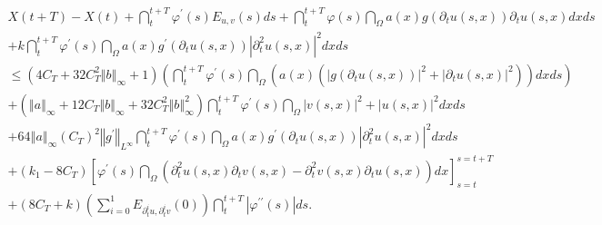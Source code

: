 \documentclass[11pt,reqno]{amsart}
\theoremstyle{plain}
\numberwithin{equation}{section}
\numberwithin{equation}{section}
\begin{document}
\begin{equation*}
\begin{array}{l}
X\left( t+T\right) -X\left( t\right) +\dint_{t}^{t+T}\varphi ^{\prime
}\left( s\right) E_{u,v}\left( s\right) ds+\dint_{t}^{t+T}\varphi \left(
s\right) \dint_{\Omega }a\left( x\right) g\left( \partial _{t}u\left(
s,x\right) \right) \partial _{t}u\left( s,x\right) dxds \\ 
+k\dint_{t}^{t+T}\varphi ^{\prime }\left( s\right) \dint_{\Omega }a\left(
x\right) g^{\prime }\left( \partial _{t}u\left( s,x\right) \right)
\left\vert \partial _{t}^{2}u\left( s,x\right) \right\vert ^{2}dxds \\ 
\leq \left( 4C_{T}+32C_{T}^{2}\left\Vert b\right\Vert _{\infty }+1\right)
\left( \dint_{t}^{t+T}\varphi ^{\prime }\left( s\right) \dint_{\Omega
}\left( a\left( x\right) \left( \left\vert g\left( \partial _{t}u\left(
s,x\right) \right) \right\vert ^{2}+\left\vert \partial _{t}u\left(
s,x\right) \right\vert ^{2}\right) \right) dxds\right) \\ 
+\left( \left\Vert a\right\Vert _{\infty }+12C_{T}\left\Vert b\right\Vert
_{\infty }+32C_{T}^{2}\left\Vert b\right\Vert _{\infty }^{2}\right)
\dint_{t}^{t+T}\varphi ^{\prime }\left( s\right) \dint_{\Omega }\left\vert
v\left( s,x\right) \right\vert ^{2}+\left\vert u\left( s,x\right)
\right\vert ^{2}dxds \\ 
+64\left\Vert a\right\Vert _{\infty }\left( C_{T}\right) ^{2}\left\Vert
g^{\prime }\right\Vert _{L^{\infty }}\dint_{t}^{t+T}\varphi ^{\prime }\left(
s\right) \dint_{\Omega }a\left( x\right) g^{\prime }\left( \partial
_{t}u\left( s,x\right) \right) \left\vert \partial _{t}^{2}u\left(
s,x\right) \right\vert ^{2}dxds \\ 
+\left( k_{1}-8C_{T}\right) \left[ \varphi ^{\prime }\left( s\right)
\dint_{\Omega }\left( \partial _{t}^{2}u\left( s,x\right) \partial
_{t}v\left( s,x\right) -\partial _{t}^{2}v\left( s,x\right) \partial
_{t}u\left( s,x\right) \right) dx\right] _{s=t}^{s=t+T} \\ 
+\left( 8C_{T}+k\right) \left( \sum_{i=0}^{1}E_{\partial _{t}^{i}u,\partial
_{t}^{i}v}\left( 0\right) \right) \dint_{t}^{t+T}\left\vert \varphi ^{\prime
\prime }\left( s\right) \right\vert ds.%
\end{array}%
\end{equation*}
\end{document}
